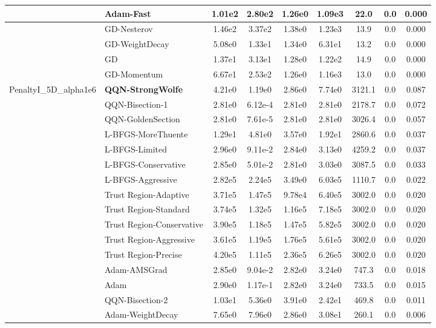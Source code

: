 \documentclass{article}
\begin{document}
\begin{longtable}{|l|l|c|c|c|c|c|c|c|}
\hline
 & Adam-Fast & 1.01e2 & 2.80e2 & 1.26e0 & 1.09e3 & 22.0 & 0.0 & 0.000 \\
\hline
 & GD-Nesterov & 1.46e2 & 3.37e2 & 1.38e0 & 1.23e3 & 13.9 & 0.0 & 0.000 \\
\hline
 & GD-WeightDecay & 5.08e0 & 1.33e1 & 1.34e0 & 6.31e1 & 13.2 & 0.0 & 0.000 \\
\hline
 & GD & 1.37e1 & 3.13e1 & 1.28e0 & 1.22e2 & 14.9 & 0.0 & 0.000 \\
\hline
 & GD-Momentum & 6.67e1 & 2.53e2 & 1.26e0 & 1.16e3 & 13.0 & 0.0 & 0.000 \\
PenaltyI\_5D\_alpha1e6 & \textbf{QQN-StrongWolfe} & 4.21e0 & 1.19e0 & 2.86e0 & 7.74e0 & 3121.1 & 0.0 & 0.087 \\
\hline
 & QQN-Bisection-1 & 2.81e0 & 6.12e-4 & 2.81e0 & 2.81e0 & 2178.7 & 0.0 & 0.072 \\
\hline
 & QQN-GoldenSection & 2.81e0 & 7.61e-5 & 2.81e0 & 2.81e0 & 3026.4 & 0.0 & 0.057 \\
\hline
 & L-BFGS-MoreThuente & 1.29e1 & 4.81e0 & 3.57e0 & 1.92e1 & 2860.6 & 0.0 & 0.037 \\
\hline
 & L-BFGS-Limited & 2.96e0 & 9.11e-2 & 2.84e0 & 3.13e0 & 4259.2 & 0.0 & 0.037 \\
\hline
 & L-BFGS-Conservative & 2.85e0 & 5.01e-2 & 2.81e0 & 3.03e0 & 3087.5 & 0.0 & 0.033 \\
\hline
 & L-BFGS-Aggressive & 2.82e5 & 2.24e5 & 3.49e0 & 6.03e5 & 1110.7 & 0.0 & 0.022 \\
\hline
 & Trust Region-Adaptive & 3.71e5 & 1.47e5 & 9.78e4 & 6.40e5 & 3002.0 & 0.0 & 0.020 \\
\hline
 & Trust Region-Standard & 3.74e5 & 1.32e5 & 1.16e5 & 7.18e5 & 3002.0 & 0.0 & 0.020 \\
\hline
 & Trust Region-Conservative & 3.90e5 & 1.18e5 & 1.47e5 & 5.82e5 & 3002.0 & 0.0 & 0.020 \\
\hline
 & Trust Region-Aggressive & 3.61e5 & 1.19e5 & 1.76e5 & 5.61e5 & 3002.0 & 0.0 & 0.020 \\
\hline
 & Trust Region-Precise & 4.20e5 & 1.11e5 & 2.36e5 & 6.26e5 & 3002.0 & 0.0 & 0.020 \\
\hline
 & Adam-AMSGrad & 2.85e0 & 9.04e-2 & 2.82e0 & 3.24e0 & 747.3 & 0.0 & 0.018 \\
\hline
 & Adam & 2.90e0 & 1.17e-1 & 2.82e0 & 3.24e0 & 733.5 & 0.0 & 0.015 \\
\hline
 & QQN-Bisection-2 & 1.03e1 & 5.36e0 & 3.91e0 & 2.42e1 & 469.8 & 0.0 & 0.011 \\
\hline
 & Adam-WeightDecay & 7.65e0 & 7.96e0 & 2.86e0 & 3.08e1 & 260.1 & 0.0 & 0.006 \\

\end{longtable}
\end{document}
